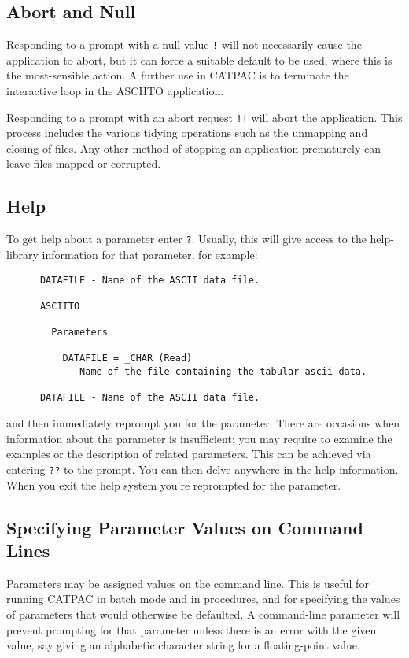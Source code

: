 \subsection{Abort and Null}

Responding to a prompt with a null value {\tt !} will not necessarily
cause the application to abort, but it can force a suitable default to
be used, where this is the most-sensible action. A further use in CATPAC
is to terminate the interactive loop in the ASCIITO application.

Responding to a prompt with an abort request {\tt !!} will abort the
application.  This process includes the various tidying operations
such as the unmapping and closing of files.  Any other method of
stopping an application prematurely can leave files mapped or corrupted.

\subsection{Help}
\label{se:parhelp}

To get help about a parameter enter {\tt ?}.  Usually, this will give
access to the help-library
information for that parameter, for example:
\begin{verbatim}
      DATAFILE - Name of the ASCII data file.

      ASCIITO

        Parameters

          DATAFILE = _CHAR (Read)
             Name of the file containing the tabular ascii data.

      DATAFILE - Name of the ASCII data file.
\end{verbatim}

and then immediately reprompt you for the parameter.  There are occasions when
information about the parameter is insufficient; you may require to examine the
examples or the description of related parameters.  This can be achieved via
entering {\tt ??} to the prompt. You can then delve anywhere in the help
information.  When you exit the help system you're reprompted for the
parameter.


\subsection{Specifying Parameter Values on Command Lines}
\label{se:cmdlindef}
Parameters may be assigned values on the command line. This is useful
for running {\small CATPAC} in batch mode and in procedures, and for
specifying the values of parameters that would otherwise be defaulted. A
command-line parameter will prevent prompting for that parameter unless
there is an error with the given value, say giving an alphabetic
character string for a floating-point value.

